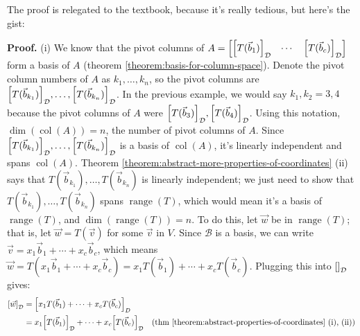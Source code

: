 \documentclass[11pt, letterpaper]{report}
\newenvironment{notes}{}{}
\newenvironment{book}{}{}
\let\originalleft\left
\let\originalright\right
\renewcommand{\left}{\mathopen{}\mathclose\bgroup\originalleft}
\renewcommand{\right}{\aftergroup\egroup\originalright}
\newcounter{example}[section]
\newcounter{theorem}[chapter]
\DeclareMathOperator{\col}{col}
\DeclareMathOperator{\range}{range}
\begin{document}
\begin{notes}
The proof is relegated to the textbook, because it's really tedious, but here's the gist:

\vfill
\newpage
\end{notes}

\begin{book}
\textbf{Proof.} (i) We know that the pivot columns of $A = \begin{bmatrix}
\left[ T(\vec{b}_1) \right]_{\mathcal{D}} & \cdots  & \left[ T(\vec{b}_c) \right]_{\mathcal{D}} 
\end{bmatrix}$ form a basis of $A$ (theorem \ref{theorem:basis-for-column-space}). Denote the pivot column numbers of $A$ as $k_1,\ldots,k_n$, so the pivot columns are $\left[T(\vec{b}_{k_1})\right]_{\mathcal{D}},\ldots, \left[T(\vec{b}_{k_n})\right]_{\mathcal{D}}$. In the previous example, we would say $k_1,k_2=3,4$ because the pivot columns of $A$ were $\left[T(\vec{b}_3)\right]_{\mathcal{D}}, \left[T(\vec{b}_4)\right]_{\mathcal{D}}$. Using this notation, $\dim(\col(A))=n$, the number of pivot columns of $A$. Since $\left[T(\vec{b}_{k_1})\right]_{\mathcal{D}},\ldots, \left[T(\vec{b}_{k_n})\right]_{\mathcal{D}}$ is a basis of $\col(A)$, it's linearly independent and spans $\col(A)$. Theorem \ref{theorem:abstract-more-properties-of-coordinates} (ii) says that $T(\vec{b}_{k_1}), \ldots, T(\vec{b}_{k_n})$ is linearly independent;  we just need to show that $T(\vec{b}_{k_1}), \ldots, T(\vec{b}_{k_n})$ spans $\range(T)$, which would mean it's a basis of $\range(T)$, and $\dim(\range(T))=n$. To do this, let $\vec{w}$ be in $\range(T)$; that is, let $\vec{w}=T(\vec{v})$ for some $\vec{v}$ in $V$. Since $\mathcal{B}$ is a basis, we can write $\vec{v}=x_1\vec{b}_1+\cdots + x_c\vec{b}_c$, which means $\vec{w}=T(x_1\vec{b}_1+\cdots + x_c\vec{b}_c) = x_1T(\vec{b}_1) + \cdots + x_cT(\vec{b}_c)$. Plugging this into $\left[  \right]_{\mathcal{D}}$ gives:
\begin{align*}
\left[ \vec{w} \right]_{\mathcal{D}} &= \left[ x_1T(\vec{b}_1) + \cdots + x_cT(\vec{b}_c) \right]_D \\
&= x_1 \left[ T(\vec{b}_1) \right]_{\mathcal{D}} + \cdots + x_c \left[ T(\vec{b}_c) \right]_{\mathcal{D}}  &\text{(thm \ref{theorem:abstract-properties-of-coordinates} (i), (ii))} \\

\end{align*}
\end{book}
\end{document}
